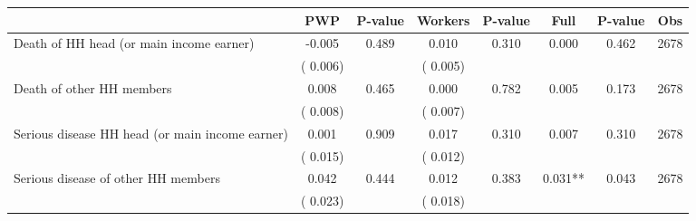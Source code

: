 
\begin{tabular}{l*{7}{c}}\hline&\multicolumn{1}{c}{PWP}&\multicolumn{1}{c}{P-value}&\multicolumn{1}{c}{Workers}&\multicolumn{1}{c}{P-value}&\multicolumn{1}{c}{Full}&\multicolumn{1}{c}{P-value}&\multicolumn{1}{c}{Obs} \\ \hline

 Death of HH head (or main income earner)       &             -0.005       &        0.489  &              0.010       &        0.310  &              0.000       &              0.462 &  2678 \\ 
                       &       (       0.006)             &                               &       (       0.005)                     &                               &                                               &                                &                      \\ 

 Death of other HH members       &              0.008       &        0.465  &              0.000       &        0.782  &              0.005       &              0.173 &  2678 \\ 
                       &       (       0.008)             &                               &       (       0.007)                     &                               &                                               &                                &                      \\ 

 Serious disease HH head (or main income earner)       &              0.001       &        0.909  &              0.017       &        0.310  &              0.007       &              0.310 &  2678 \\ 
                       &       (       0.015)             &                               &       (       0.012)                     &                               &                                               &                                &                      \\ 

 Serious disease of other HH members       &              0.042       &        0.444  &              0.012       &        0.383  &              0.031**       &              0.043 &  2678 \\ 
                       &       (       0.023)             &                               &       (       0.018)                     &                               &                                               &                                &                      \\ 


\end{tabular}
